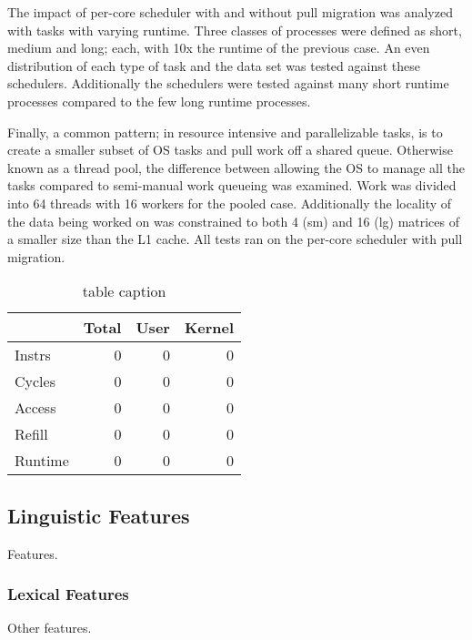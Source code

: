 \documentclass{cys}
\begin{document}
The impact of per-core scheduler with and without pull migration was analyzed with tasks with varying runtime.  Three classes of processes were defined as short, medium and long; each, with 10x the runtime of the previous case.  An even distribution of each type of task and the data set was tested against these schedulers.  Additionally the schedulers were tested against many short runtime processes compared to the few long runtime processes.

Finally, a common pattern; in resource intensive and parallelizable tasks, is to create a smaller subset of OS tasks and pull work off a shared queue.  Otherwise known as a thread pool, the difference between allowing the OS to manage all the tasks compared to semi-manual work queueing was examined.  Work was divided into 64 threads with 16 workers for the pooled case.  Additionally the locality of the data being worked on was constrained to both 4 (sm) and 16 (lg) matrices of a smaller size than the L1 cache.  All tests ran on the per-core scheduler with pull migration.  

\begin{table}[h!]
    \centering
    \begin{tabular}{ l|rrr }
        & Total & User & Kernel \\
        \hline
        Instrs & 0 & 0 & 0 \\
        Cycles & 0 & 0 & 0 \\
        Access & 0 & 0 & 0 \\
        Refill & 0 & 0 & 0 \\
        Runtime & 0 & 0 & 0 \\
        \hline
    \end{tabular}
    \caption{table caption}        
\end{table}

\subsection{Linguistic Features}
\label{subsection:linguistic}

Features. 

\subsubsection{Lexical Features}
\label{subsection:lexicalFeatures}

Other features.
\end{document}
